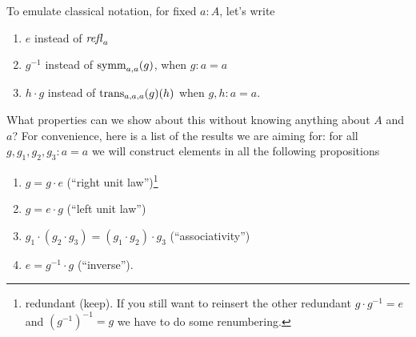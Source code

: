  To emulate classical notation, for fixed $a:A$,  %
let's write
 \begin{enumerate}
 \item $e$ instead of $\mathop{\mathit{refl}_{a}}{}$
 \item $g^{-1}$ instead of $\mathop{\mathrm{symm}}_{a,a}(g)$, when $g:a=a$
 \item $h\cdot g$ instead of $\mathop{\mathrm{trans}}_{a,a,a}(g)(h)$ when $g,h:a=a$.
 \end{enumerate}
 What properties can we show about this without knowing anything about $A$ and $a$? For convenience, here is a list of the results we are aiming for: for all $g,g_1,g_2,g_3:a=a$ we will construct elements in all the following propositions
 \begin{enumerate}
 \item $g=g\cdot e$  \qquad(``right unit law'')\footnote{redundant (keep).  If you still want to reinsert the other redundant $g\cdot g^{-1}=e$ and $(g^{-1})^{-1}=g$ we have to do some renumbering.  
}
 \item $g=e\cdot g$ \qquad(``left unit law'')
 \item $g_1\cdot(g_2\cdot g_3)=(g_1\cdot g_2)\cdot g_3$ \qquad(``associativity'')
 \item $e=g^{-1}\cdot g$ \qquad(``inverse'').
 \end{enumerate}
 

